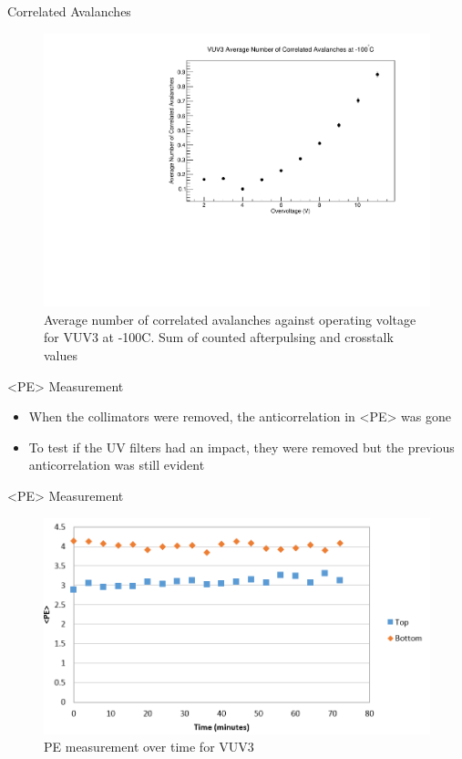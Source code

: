 \documentclass{beamer}
\begin{document}
\begin{frame}{Correlated Avalanches}
\begin{figure}
\centering
\includegraphics[height=0.5\textwidth]{VUV3_CA_vs_OV.pdf}
\caption{Average number of correlated avalanches against operating voltage for VUV3 at -100C. Sum of counted afterpulsing and crosstalk values}
\end{figure}
\end{frame}

\begin{frame}{<PE> Measurement}
\begin{itemize}
\item When the collimators were removed, the anticorrelation in <PE> was gone
\item To test if the UV filters had an impact, they were removed but the previous anticorrelation was still evident
\end{itemize}
\end{frame}

\begin{frame}{<PE> Measurement}
\begin{figure}
\centering
\includegraphics[height=0.5\textwidth]{PE.PNG}
\caption{PE measurement over time for VUV3}
\end{figure}
\end{frame}
\end{document}
